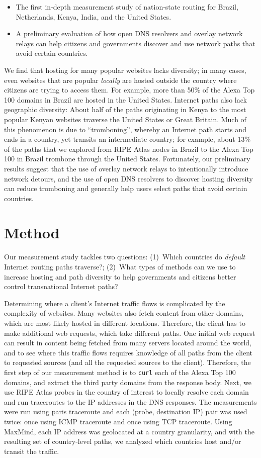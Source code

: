 \begin{itemize}
\item The first in-depth measurement study of
  nation-state routing for Brazil, Netherlands, Kenya, India, and the
  United States. 
\item A preliminary evaluation of how open DNS resolvers and overlay
  network relays can help citizens and governments discover and use
  network paths that avoid certain countries.
\end{itemize}
\noindent
We find that hosting for many popular websites lacks diversity; in many
cases, even websites that are popular {\em locally} are hosted outside
the country where citizens are trying to access them. For example, more
than 50\% of the Alexa Top 100 domains in Brazil are hosted in the
United States. Internet paths also lack geographic diversity: About half
of the paths originating in Kenya to the most popular Kenyan websites
traverse the United States or Great Britain. Much of this phenomenon is
due to ``tromboning'', whereby an Internet path starts and ends in a
country, yet transits an intermediate country; for example, about 13\%
of the paths that we explored from RIPE Atlas nodes in Brazil to the
Alexa Top 100 in Brazil trombone through the United States. Fortunately,
our preliminary results suggest that the use of overlay network relays
to intentionally introduce network detours, and the use of open DNS
resolvers to discover hosting diversity can reduce tromboning and
generally help users select paths that avoid certain countries.

\section{Method}

Our measurement study tackles two questions: (1)~Which countries do {\em
  default} Internet routing paths traverse?; (2)~What types of methods
can we use to increase hosting and path diversity to help governments
and citizens better control transnational Internet paths?

Determining where a client's Internet traffic flows is complicated by
the complexity of websites.  Many
websites also fetch content from other domains, which are most likely
hosted in different locations.  Therefore, the client has to make
additional web requests, which take different paths.  One initial web
request can result in content being fetched from many servers located
around the world, and to see where this traffic flows requires knowledge
of all paths from the client to requested sources (and all the requested
sources to the client).  Therefore, the first step of our measurement 
method is to {\tt curl} each of the Alexa Top 100 domains, and extract 
the third party domains from the response body.  Next, we use RIPE Atlas 
probes in the country of interest to locally resolve each domain and run 
traceroutes to the IP addresses in the DNS responses.  The measurements 
were run using paris traceroute and each (probe, destination IP) pair 
was used twice: once using ICMP traceroute and once using TCP traceroute. 
Using MaxMind, each IP address was geolocated at a country granularity, 
and with the resulting set of country-level paths, we analyzed which 
countries host and/or transit the traffic.

